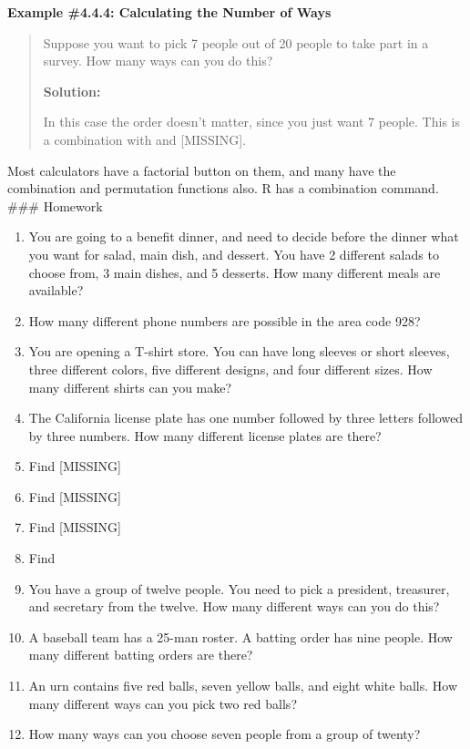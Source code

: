 \documentclass[]{book}
\begin{document}
\textbf{Example \#4.4.4: Calculating the Number of Ways}

\begin{quote}
Suppose you want to pick 7 people out of 20 people to take part in a survey. How many ways can you do this?

\textbf{Solution:}

In this case the order doesn't matter, since you just want 7 people. This is a combination with and {[}MISSING{]}.
\end{quote}

Most calculators have a factorial button on them, and many have the combination and permutation functions also. R has a combination command.
\#\#\# Homework

\begin{enumerate}
\def\labelenumi{\arabic{enumi}.}
\item
  You are going to a benefit dinner, and need to decide before the dinner what you want for salad, main dish, and dessert. You have 2 different salads to choose from, 3 main dishes, and 5 desserts. How many different meals are available?
\item
  How many different phone numbers are possible in the area code 928?
\item
  You are opening a T-shirt store. You can have long sleeves or short sleeves, three different colors, five different designs, and four different sizes. How many different shirts can you make?
\item
  The California license plate has one number followed by three
  letters followed by three numbers. How many different license plates
  are there?
\item
  Find {[}MISSING{]}
\item
  Find {[}MISSING{]}
\item
  Find {[}MISSING{]}
\item
  Find
\item
  You have a group of twelve people. You need to pick a president,
  treasurer, and secretary from the twelve. How many different ways
  can you do this?
\item
  A baseball team has a 25-man roster. A batting order has nine
  people. How many different batting orders are there?
\item
  An urn contains five red balls, seven yellow balls, and eight white
  balls. How many different ways can you pick two red balls?
\item
  How many ways can you choose seven people from a group of twenty?
\end{enumerate}
\end{document}
